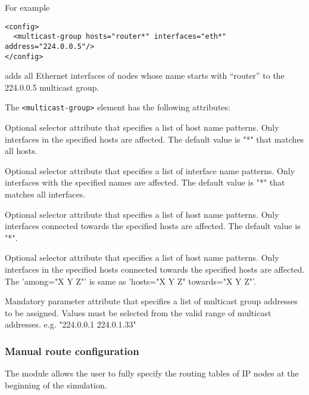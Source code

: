 For example
\begin{verbatim}
<config>
  <multicast-group hosts="router*" interfaces="eth*" address="224.0.0.5"/>
</config>
\end{verbatim}
adds all Ethernet interfaces of nodes whose name starts with ``router''
to the 224.0.0.5 multicast group.

The \verb!<multicast-group>! element has the following attributes:
\begin{compactitem}
    \item {}
      Optional selector attribute that specifies a list of host name patterns.
      Only interfaces in the specified hosts are affected. The default value
      is "*" that matches all hosts.

    \item {}
      Optional selector attribute that specifies a list of interface name
      patterns. Only interfaces with the specified names are affected. The
      default value is "*" that matches all interfaces.

    \item {}
      Optional selector attribute that specifies a list of host name patterns.
      Only interfaces connected towards the specified hosts are affected.
      The default value is "*".

    \item {}
      Optional selector attribute that specifies a list of host name patterns.
      Only interfaces in the specified hosts connected towards the specified
      hosts are affected.
      The 'among="X Y Z"' is same as 'hosts="X Y Z" towards="X Y Z"'.

    \item {}
      Mandatory parameter attribute that specifies a list of multicast group
      addresses to be assigned. Values must be selected from the valid range
      of multicast addresses.
      e.g. "224.0.0.1 224.0.1.33"
\end{compactitem}


\subsubsection*{Manual route configuration}

The  module allows the user
to fully specify the routing tables of IP nodes at the beginning
of the simulation.

